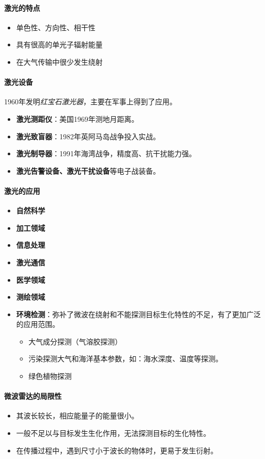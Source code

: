 \paragraph{激光的特点} \begin{itemize}
	\item 单色性、方向性、相干性
	\item 具有很高的单光子辐射能量
	\item 在大气传输中很少发生绕射
\end{itemize}
\paragraph{激光设备}1960年发明\textit{红宝石激光器}，主要在军事上得到了应用。\begin{itemize}
	\item \textbf{激光测距仪}：美国1969年测地月距离。
	\item \textbf{激光致盲器}：1982年英阿马岛战争投入实战。
	\item \textbf{激光制导器}：1991年海湾战争，精度高、抗干扰能力强。
	\item \textbf{激光告警设备、激光干扰设备}等电子战装备。
\end{itemize}
\paragraph{激光的应用}\begin{itemize}
	\item \textbf{自然科学}
	\item \textbf{加工领域}
	\item \textbf{信息处理}
	\item \textbf{激光通信}
	\item \textbf{医学领域}
	\item \textbf{测绘领域}
	\item \textbf{环境检测}：弥补了微波在绕射和不能探测目标生化特性的不足，有了更加广泛的应用范围。 \begin{itemize}
		\item 大气成分探测（气溶胶探测）
		\item 污染探测大气和海洋基本参数，如：海水深度、温度等探测。
		\item 绿色植物探测
	\end{itemize}
\end{itemize}
\paragraph{微波雷达的局限性}\begin{itemize}
	\item 其波长较长，相应能量子的能量很小。
	\item 一般不足以与目标发生生化作用，无法探测目标的生化特性。
	\item 在传播过程中，遇到尺寸小于波长的物体时，更易于发生衍射。
\end{itemize}
